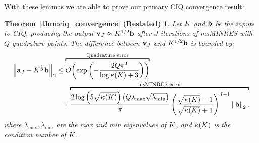With these lemmas we are able to prove our primary CIQ convergence result:
%
\newtheorem*{ciq_convergence}{Theorem~\ref{thm:ciq_convergence} (Restated)}
\begin{ciq_convergence}
  Let $K$ and $\mathbf{b}$ be the inputs to CIQ, producing the output $\mathbf{v}_J \approx K^{1/2} \mathbf{b}$ after $J$ iterations of msMINRES with $Q$ quadrature points.
  The difference between $\mathbf{v}_J$ and $K^{1/2} \mathbf{b}$ is bounded by:
  \begin{align*}
    \left\Vert \ba_J - \bK^{\frac 1 2} \bb \right\Vert_2
    &\leq
    \overbracket{
      \bigo{\exp\left( -\frac  {2 Q \pi^2}{\log \kappa(\bK) + 3} \right)}
    }^{\text{Quadrature error}}
    \\
    &\phantom{=} +
    \overbracket{
      \frac{ 2 \log \left( 5 \sqrt{\kappa(\bK)} \right)  \left( Q \lambda_\text{max} \sqrt{\lambda_\text{min}} \right) }{\pi}
      \left( \frac{ \sqrt{\kappa(\bK)} - 1}{ \sqrt{\kappa(\bK)} + 1} \right)^{J-1}
      \left\Vert \bb \right\Vert_2.
    }^{\text{msMINRES error}}
  \end{align*}
  where $\lambda_\text{max},\lambda_{\text{min}}$ are the max and min eigenvalues of $K$, and $\kappa(K)$ is the condition number of $K$.
\end{ciq_convergence}
%
